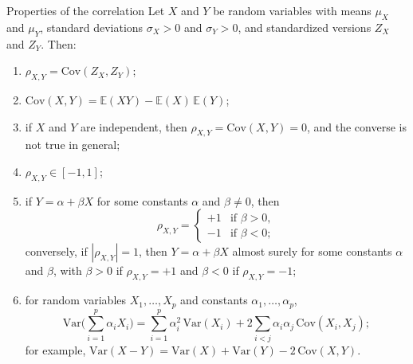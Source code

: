 \documentclass[a4paper,12pt,oneside]{report}
\begin{document}
\begin{framedprop}{Properties of the correlation}\label{prop:corr-properties}
Let $X$ and $Y$ be random variables with means $\mu_X$ and $\mu_Y$,
standard deviations $\sigma_X>0$ and $\sigma_Y>0$, and standardized
versions $Z_X$ and $Z_Y$. Then:
\begin{enumerate}
\item $\rho_{X,Y}=\mathrm{Cov}(Z_X,Z_Y)$;
\item $\mathrm{Cov}(X,Y)=\mathbb{E}(XY)-\mathbb{E}(X)\,\mathbb{E}(Y)$;
\item if $X$ and $Y$ are independent, then $\rho_{X,Y}=\mathrm{Cov}(X,Y)=0$,
and the converse is not true in general;
\item $\rho_{X,Y}\in[-1,1]$;
\item if $Y=\alpha+\beta X$ for some constants $\alpha$ and $\beta\ne0$, then
\[
\rho_{X,Y}=\begin{cases}+1&\text{if }\beta>0,\\-1&\text{if }\beta<0;\end{cases}
\]
conversely, if $|\rho_{X,Y}|=1$, then $Y=\alpha+\beta X$ almost surely for
some constants $\alpha$ and $\beta$, with $\beta>0$ if $\rho_{X,Y}=+1$ and
$\beta<0$ if $\rho_{X,Y}=-1$;
\item for random variables $X_1,\ldots,X_p$ and constants
$\alpha_1,\ldots,\alpha_p$,
\[
\mathrm{Var}\Big(\sum_{i=1}^p\alpha_iX_i\Big)
=\sum_{i=1}^p\alpha_i^2\,\mathrm{Var}(X_i)+2\sum_{i<j}\alpha_i\alpha_j\,\mathrm{Cov}(X_i,X_j);
\]
for example, $\mathrm{Var}(X-Y)=\mathrm{Var}(X)+\mathrm{Var}(Y)-2\,\mathrm{Cov}(X,Y)$.
\end{enumerate}
\end{framedprop}
\end{document}
